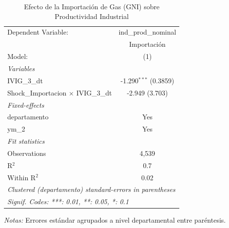 \documentclass[12pt]{article}
\begin{document}
\setcounter{table}{11}
\begin{table}[htbp]
\centering
\begin{threeparttable}

   \caption{Efecto de la Importación de Gas (GNI) sobre Productividad Industrial}
   \centering
   \small
   \begin{tabular}{lc}
      \tabularnewline \midrule \midrule
      Dependent Variable:                         & ind\_prod\_nominal\\    
                                                  & Importación \\   
      Model:                                      & (1)\\  
      \midrule
      \emph{Variables}\\
      IVIG\_3\_dt                                 & -1.290$^{***}$ (0.3859)\\   
      Shock\_Importacion $\times$ IVIG\_3\_dt     & -2.949 (3.703)\\   
      \midrule
      \emph{Fixed-effects}\\
      departamento                                & Yes\\  
      ym\_2                                       & Yes\\  
      \midrule
      \emph{Fit statistics}\\
      Observations                                & 4,539\\  
      R$^2$                                       & 0.7\\  
      Within R$^2$                                & 0.02\\  
      \midrule \midrule
      \multicolumn{2}{l}{\emph{Clustered (departamento) standard-errors in parentheses}}\\
      \multicolumn{2}{l}{\emph{Signif. Codes: ***: 0.01, **: 0.05, *: 0.1}}\\
   \end{tabular}


\begin{tablenotes}
\footnotesize
\item \textit{Notas:} Errores estándar agrupados a nivel departamental entre paréntesis.
\end{tablenotes}
\end{threeparttable}
\end{table}
\end{document}
